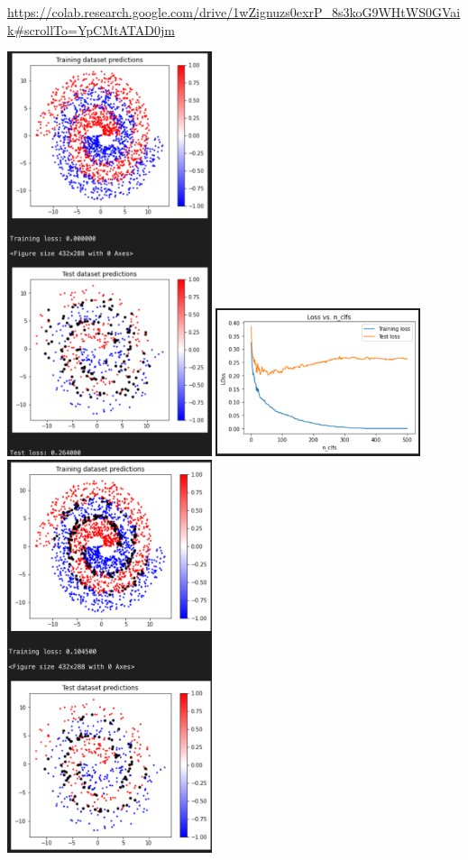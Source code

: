\begin{solution}
    \url{https://colab.research.google.com/drive/1wZignuzs0exrP_8s3koG9WHtWS0GVaik#scrollTo=YpCMtATAD0jm}
    \begin{center}
        \includegraphics[width=0.45\textwidth]{GB1.png}
        \includegraphics[width=0.45\textwidth]{GB2.png}
        \includegraphics[width=0.45\textwidth]{ada1.png}

\end{center}
\end{solution}
